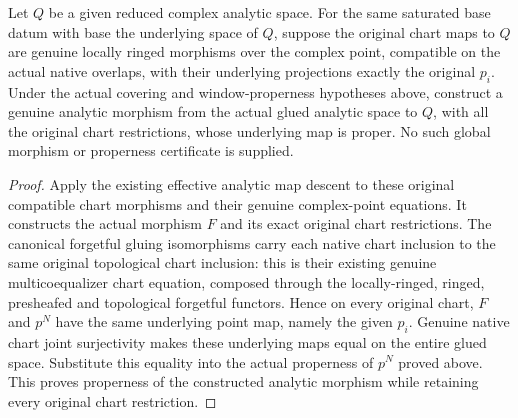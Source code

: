 \begin{theorem}
\label{hir:disjoint-proper-analytic-map-descent}
\leanok
Let $Q$ be a given reduced complex analytic space. For the same saturated
base datum with base the underlying space of $Q$, suppose the original chart
maps to $Q$ are genuine locally ringed morphisms over the complex point,
compatible on the actual native overlaps, with their underlying projections
exactly the original $p_i$. Under the actual covering and window-properness
hypotheses above, construct a genuine analytic morphism from the actual glued
analytic space to $Q$, with all the original chart restrictions, whose
underlying map is proper. No such global morphism or properness certificate
is supplied.
\end{theorem}
\begin{proof}
Apply the existing effective analytic map descent to these original compatible
chart morphisms and their genuine complex-point equations. It constructs the
actual morphism $F$ and its exact original chart restrictions. The canonical
forgetful gluing isomorphisms carry each native chart inclusion to the same
original topological chart inclusion: this is their existing genuine
multicoequalizer chart equation, composed through the locally-ringed,
ringed, presheafed and topological forgetful functors. Hence on every original
chart, $F$ and $p^N$ have the same underlying point map, namely the given
$p_i$. Genuine native chart joint surjectivity makes these underlying maps
equal on the entire glued space. Substitute this equality into the actual
properness of $p^N$ proved above. This proves properness of the constructed
analytic morphism while retaining every original chart restriction.
\end{proof}

